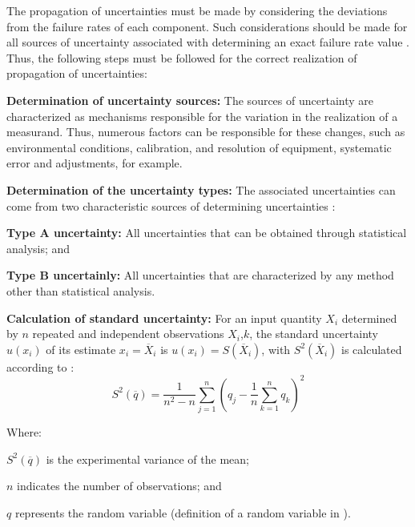 \documentclass{ws-m3as}
\begin{document}
The propagation of uncertainties must be made by considering the deviations from the failure rates of each component. Such considerations should be made for all sources of uncertainty associated with determining an exact failure rate value \cite{VIM2012}. Thus, the following steps must be followed for the correct realization of propagation of uncertainties:

\begin{romanlist}[(ii)]
	
\item \textbf{Determination of uncertainty sources:} The sources of uncertainty are characterized as mechanisms responsible for the variation in the realization  of a measurand. Thus, numerous factors can be responsible for these changes, such as environmental conditions, calibration, and resolution of equipment, systematic error and adjustments, for example.

\item \textbf{Determination of the uncertainty types:} The associated uncertainties can come from two characteristic sources of determining uncertainties \cite{VIM2012}: 

\begin{itemlist}
	
\item \textbf{Type A uncertainty:} All uncertainties that can be obtained through statistical analysis; and 
\item \textbf{Type B uncertainly:} All uncertainties that are characterized by any method other than statistical analysis. 
\end{itemlist}

\item \textbf{Calculation of standard uncertainty:} For an input quantity $X_{i}$  determined by $n$ repeated and independent observations $X_{i}$,$k$, the standard uncertainty $u(x_{i})$ of its estimate $x_{i}=\overline{X}_{i}$ is $u(x_{i})=S(\overline{X}_{i})$, with $S^{2}(\overline{X}_{i})$ is calculated according to \cite{GUN2008}:
\begin{equation}
S^{2}(\overline{q})=\frac{1}{n^{2}-n}\sum_{j=1}^{n} (q_{j}-\frac{1}{n}\sum\limits_{k=1}^{n}q_{k})^{2}
\end{equation}

Where:
\begin{itemlist}
	\item $S^{2}(\overline{q})$ is the experimental variance of the mean; 
	\item $n$ indicates the number of observations; and
	\item $q$ represents the random variable (definition of a random variable in \cite{GUN2008}).
\end{itemlist}


\end{romanlist}
\end{document}

